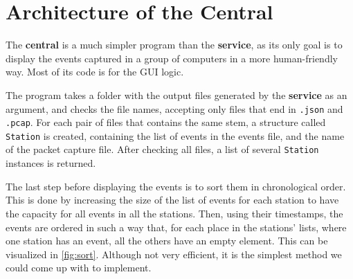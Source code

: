 \section{Architecture of the Central}\label{sect:archcen}

The \textbf{central} is a much simpler program than the \textbf{service}, as its
only goal is to display the events captured in a group of computers in a more
human-friendly way. Most of its code is for the \ac{GUI} logic.

The program takes a folder with the output files generated by the
\textbf{service} as an argument, and checks the file names, accepting only files
that end in \texttt{.json} and \texttt{.pcap}. For each pair of files that
contains the same stem, a structure called \texttt{Station} is created,
containing the list of events in the events file, and the name of the packet
capture file. After checking all files, a list of several \texttt{Station}
instances is returned.

The last step before displaying the events is to sort them in chronological
order. This is done by increasing the size of the list of events for each
station to have the capacity for all events in all the stations. Then, using
their timestamps, the events are ordered in such a way that, for each place in
the stations' lists, where one station has an event, all the others have an
empty element. This can be visualized in \autoref{fig:sort}. Although not very
efficient, it is the simplest method we could come up with to implement.

